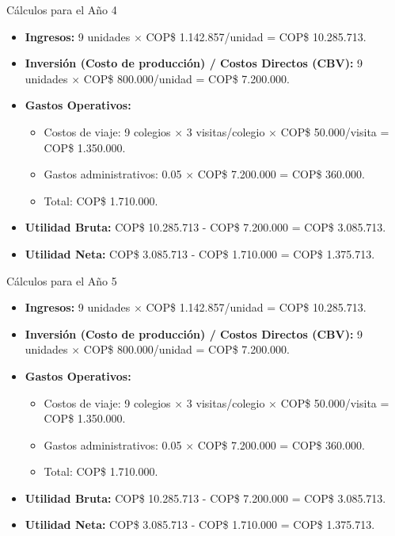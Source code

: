 \begin{frame}{Cálculos para el Año 4}
    \begin{itemize}
        \item \textbf{Ingresos:} 9 unidades $\times$ COP\$ 1.142.857/unidad = 
					COP\$ 10.285.713. 
        \item \textbf{Inversión (Costo de producción) / Costos Directos (CBV):} 
					9 unidades $\times$ COP\$ 800.000/unidad = COP\$ 7.200.000. 
        \item \textbf{Gastos Operativos:}
        \begin{itemize}
            \item Costos de viaje: 9 colegios $\times$ 3 visitas/colegio 
							$\times$ COP\$ 50.000/visita = COP\$ 1.350.000. 
            \item Gastos administrativos: 0.05 $\times$ COP\$ 7.200.000 = 
							COP\$ 360.000. 
            \item Total: COP\$ 1.710.000. 
        \end{itemize}
        \item \textbf{Utilidad Bruta:} COP\$ 10.285.713 - COP\$ 7.200.000 = COP\$ 3.085.713. 
        \item \textbf{Utilidad Neta:} COP\$ 3.085.713 - COP\$ 1.710.000 = COP\$ 1.375.713. 
    \end{itemize}
\end{frame}

\begin{frame}{Cálculos para el Año 5}
    \begin{itemize}
        \item \textbf{Ingresos:} 9 unidades $\times$ COP\$ 1.142.857/unidad = 
					COP\$ 10.285.713. 
        \item \textbf{Inversión (Costo de producción) / Costos Directos (CBV):} 
					9 unidades $\times$ COP\$ 800.000/unidad = COP\$ 7.200.000.
        \item \textbf{Gastos Operativos:}
        \begin{itemize}
            \item Costos de viaje: 9 colegios $\times$ 3 visitas/colegio 
							$\times$ COP\$ 50.000/visita = COP\$ 1.350.000. 
            \item Gastos administrativos: 0.05 $\times$ COP\$ 7.200.000 = 
							COP\$ 360.000. 
            \item Total: COP\$ 1.710.000. 
        \end{itemize}
        \item \textbf{Utilidad Bruta:} COP\$ 10.285.713 - COP\$ 7.200.000 = COP\$ 3.085.713. 
        \item \textbf{Utilidad Neta:} COP\$ 3.085.713 - COP\$ 1.710.000 = COP\$ 1.375.713. 
    \end{itemize}
\end{frame}

